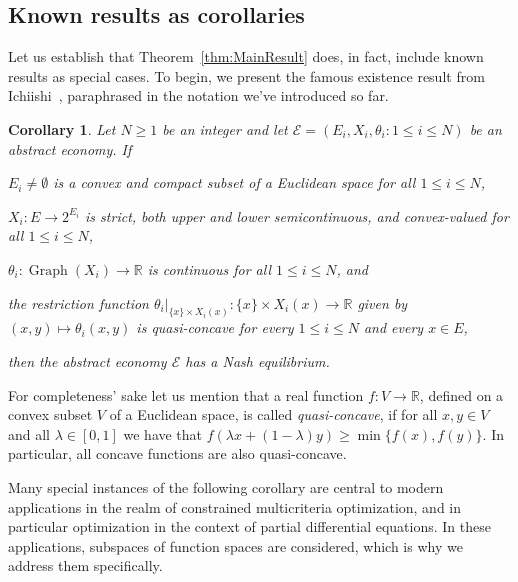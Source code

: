 \documentclass[a4paper,11pt,reqno,english]{amsart}
\newtheorem{corollary}[theorem]{Corollary}
\theoremstyle{definition}
\newcommand\R{\mathbb R}
\begin{document}
\subsection{Known results as corollaries}

Let us establish that Theorem~\ref{thm:MainResult} does, in fact, include known results as special cases. To begin, we present the famous existence result from Ichiishi~\cite[Thm.\,4.3.1]{Ichiishi_1983}, paraphrased in the notation we've introduced so far.

\begin{corollary}\label{cor:Ichiishi_1983}
	Let $N\geq 1$ be an integer and let $\mathcal{E}=(E_i,X_i,\theta_i : 1\leq i\leq N)$ be an abstract economy.
	If
	\begin{compactenum}[\quad \rm(1)]
		\item  $E_i\neq \emptyset$ is a convex and compact subset of a Euclidean space for all $1\leq i \leq N$,
		\item  $X_i\colon E\longrightarrow 2^{E_i}$ is strict, both upper and lower semicontinuous, and convex-valued for all $1\leq i \leq N$,
		\item $\theta_i\colon\operatorname{Graph}(X_i)\longrightarrow\R$ is continuous for all $1\leq i \leq N$, and
		\item the restriction function $\theta_i|_{\{x\}\times X_i(x)}\colon \{x\}\times X_i(x)\longrightarrow \R$ given by $(x,y)\longmapsto \theta_i(x,y)$ is quasi-concave for every $1\leq i \leq N$ and every $x\in E$,
	\end{compactenum}
	then the abstract economy $\mathcal{E}$ has a Nash equilibrium.
\end{corollary}

For completeness' sake let us mention that a real function $f\colon V\longrightarrow\mathbb{R}$, defined on a convex subset $V$ of a Euclidean space, is called \textit{quasi-concave}, if for all $x,y\in V$ and all $\lambda\in[0,1]$ we have that $f(\lambda x + (1-\lambda)y) \geq \min\{f(x),f(y)\}$. In particular, all concave functions are also quasi-concave.

\medskip
Many special instances of the following corollary are central to modern applications in the realm of constrained multicriteria optimization, and in particular optimization in the context of partial differential equations.
In these applications, subspaces of function spaces are considered, which is why we address them specifically.
\end{document}
